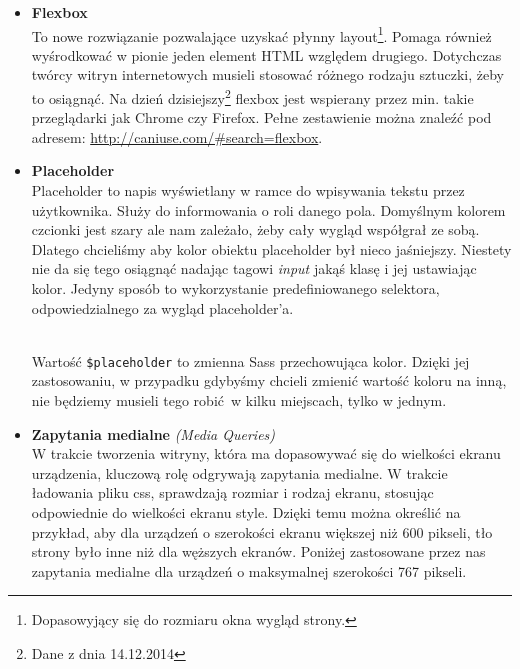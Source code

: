         \begin{itemize}
          \item \textbf{Flexbox}\\
            To nowe rozwiązanie pozwalające uzyskać płynny layout\footnote{Dopasowyjący się do rozmiaru okna wygląd strony.}. Pomaga również wyśrodkować w pionie jeden element HTML względem drugiego. Dotychczas twórcy witryn internetowych musieli stosować różnego rodzaju sztuczki, żeby to osiągnąć. Na dzień dzisiejszy\footnote{Dane z dnia 14.12.2014} flexbox jest wspierany przez min. takie przeglądarki jak Chrome czy Firefox. Pełne zestawienie można znaleźć pod adresem: \url{http://caniuse.com/\#search=flexbox}. \\
            

          \item \textbf{Placeholder}\\
            Placeholder to napis wyświetlany w ramce do wpisywania tekstu przez użytkownika. Służy do informowania o roli danego pola. Domyślnym kolorem czcionki jest szary ale nam zależało, żeby cały wygląd współgrał ze sobą. Dlatego chcieliśmy aby kolor obiektu placeholder był nieco jaśniejszy. Niestety nie da się tego osiągnąć nadając tagowi \emph{input} jakąś klasę i jej ustawiając kolor. Jedyny sposób to wykorzystanie predefiniowanego selektora, odpowiedzialnego za wygląd placeholder'a.

            \begin{code}
              
            \end{code}\\

            Wartość \texttt{\$placeholder} to zmienna Sass przechowująca kolor. Dzięki jej zastosowaniu, w przypadku gdybyśmy chcieli zmienić wartość koloru na inną, nie będziemy musieli tego robić w kilku miejscach, tylko w jednym.

          \item \textbf{Zapytania medialne} \emph{(Media Queries)}\\ 
            W trakcie tworzenia witryny, która ma dopasowywać się do wielkości ekranu urządzenia, kluczową rolę odgrywają zapytania medialne. W trakcie ładowania pliku css, sprawdzają rozmiar i rodzaj ekranu, stosując odpowiednie do wielkości ekranu style. Dzięki temu można określić na przykład, aby dla urządzeń o szerokości ekranu większej niż 600 pikseli, tło strony było inne niż dla węższych ekranów.
            Poniżej zastosowane przez nas zapytania medialne dla urządzeń o maksymalnej szerokości 767 pikseli.
            \begin{code}
              
            \end{code}
        \end{itemize}
